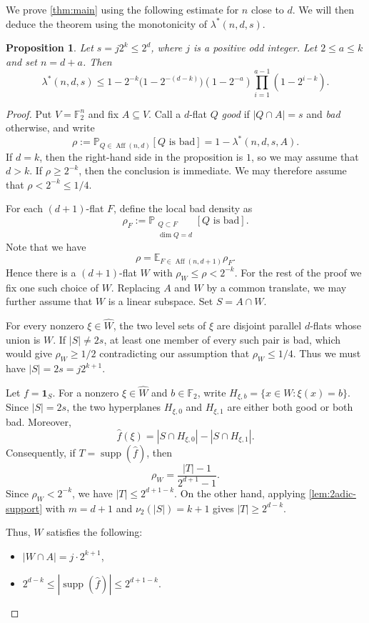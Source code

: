 \documentclass[10pt,a4paper]{amsart}
\newtheorem{proposition}[theorem]{Proposition}
\newcommand{\F}{\mathbb F}
\newcommand{\E}{\mathbb E}
\renewcommand{\P}{\mathbb P}
\newcommand{\one}{\mathbf 1}
\DeclareMathOperator{\Aff}{Aff}
\DeclareMathOperator{\supp}{supp}
\begin{document}
We prove \cref{thm:main} using the following 
estimate for $n$ close to $d$. We will then deduce the theorem using the monotonicity of $\lambda^*(n,d,s)$.

\begin{proposition}\label{prop:finite}
Let $s=j2^k\le2^d$, where $j$ is a positive odd integer. Let
$2\le a\le k$ and set
$n=d+a$. Then
\[
  \lambda^*(n,d,s)
  \le 1-2^{-k}\bigl(1-2^{-(d-k)}\bigr)(1-2^{-a})
  \prod_{i=1}^{a-1}(1-2^{i-k}).
\]
\end{proposition}

\begin{proof}
Put $V=\F_2^n$ and fix $A\subseteq V$.  Call a $d$-flat $Q$
\emph{good} if $|Q\cap A|=s$ and \emph{bad} otherwise, and write
\[
  \rho:=\P_{Q\in\Aff(n,d)}[Q\text{ is bad}]
       =1-\lambda^*(n,d,s,A).
\]
If $d=k$, then the
right-hand side in the proposition is $1$, so we may assume that $d>k$.
If $\rho\ge2^{-k}$, then the conclusion is immediate.  We may therefore
assume that $\rho<2^{-k}\le1/4$.

For each $(d+1)$-flat $F$, define the local bad density as
\[
  \rho_F:=\P_{\substack{Q\subset F\\ \dim Q=d}}[Q\text{ is bad}].
\]
Note that we have
\[\rho=\E_{F\in\Aff(n,d+1)}\rho_F.\]
Hence there is a $(d+1)$-flat $W$ with $\rho_W\le\rho<2^{-k}$. For the rest of the proof we fix one such choice of $W$.
Replacing $A$ and $W$ by a common translate, we may further assume that $W$ is
a linear subspace.  Set $S=A\cap W$.

For every nonzero $\xi\in\widehat W$, the two level sets of $\xi$ are
disjoint parallel $d$-flats whose union is $W$.  If $|S|\ne2s$, at
least one member of every such pair is bad, which would give
$\rho_W\ge1/2$ contradicting our assumption that $\rho_W\le 1/4$.  Thus we must have $|S|=2s=j2^{k+1}$.

Let $f=\one_S$.  For a nonzero $\xi\in\widehat W$ and $b \in \F_2$, write
$H_{\xi,b}=\{x\in W:\xi(x)=b\}$.  Since $|S|=2s$, the two hyperplanes
$H_{\xi,0}$ and $H_{\xi,1}$ are either both good or both bad.  Moreover,
\[
  \widehat f(\xi)
  =|S\cap H_{\xi,0}|-|S\cap H_{\xi,1}|.
\]
Consequently, if $T=\supp(\widehat f)$, then
\[
  \rho_W=\frac{|T|-1}{2^{d+1}-1}.
\]
Since $\rho_W< 2^{-k}$, we have $|T|\le2^{d+1-k}$. On the other hand, applying \cref{lem:2adic-support} with $m=d+1$ and $\nu_2(|S|)=k+1$ gives $|T|\ge2^{d-k}$.

Thus, $W$ satisfies the following:
\begin{itemize}
    \item $|W\cap A| = j\cdot 2^{k+1}$,
    \item $2^{d-k}\le |\supp(\widehat{f})|\le 2^{d+1-k}$.
\end{itemize}


\end{proof}
\end{document}
